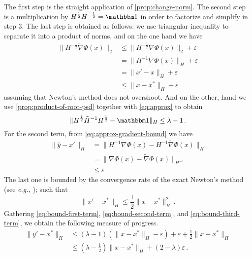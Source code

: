 The first step is the straight application of \autoref{prop:change-norm}. The
second step is a multiplication by $H^{\frac 1 2}H^{-\frac 1 2} = \mathbbm 1$ in
order to factorize and simplify in step 3. The last step is obtained as follows:
we use triangular inequality to separate it into a product of norms, and on the
one hand we have
\begin{equation*}
    \begin{aligned}
        \| H^{-\frac{1}{2}}\tilde \nabla \Phi(x)\|_2
        & \leq \| H^{-\frac{1}{2}} \nabla \Phi(x)\|_2 + \varepsilon\\
        & = \| H^{-1} \nabla \Phi(x)\|_H + \varepsilon \\
        & = \| x' - x \|_H + \varepsilon \\
        & \leq \| x - x^*\|_H + \varepsilon
   \end{aligned}
\end{equation*}
assuming that Newton's method does not overshoot. And on the other, hand we use
\autoref{prop:product-of-root-psd} together with \autoref{eq:approx} to obtain
\begin{equation*}
    \|H^{\frac{1}{2}}\tilde H^{-1}H^{\frac{1}{2}} - \mathbbm 1 \|_H \leq \lambda - 1 \, .
\end{equation*}
For the second term, from \autoref{eq:approx-gradient-bound} we have
\begin{equation}\label{eq:bound-second-term}
   \begin{aligned}
    \| \hat y - x' \|_H
        & = \|H^{-1}\nabla\Phi(x) - H^{-1}\tilde\nabla\Phi(x) \|_H \\
        & = \|\nabla\Phi(x) - \tilde\nabla\Phi(x) \|_{H^{-1}} \\
        & \leq \varepsilon
   \end{aligned}
\end{equation}
The last one is bounded by the convergence rate of the exact Newton's method
(see \emph{e.g.,} \cite[p. 43]{numerical_2006}); such that
\begin{equation}\label{eq:bound-third-term}
    \| x' - x^* \|_H \leq \frac{1}{2} \| x - x^*\|^2_H \, .
\end{equation}
Gathering \autoref{eq:bound-first-term}, \autoref{eq:bound-second-term}, and
\autoref{eq:bound-third-term}, we obtain the following measure of progress.
\begin{equation*}
    \begin{aligned}
        \| y' - x^* \|_H
            & \leq (\lambda - 1) \left(\|x - x^*\|_H - \varepsilon\right) + \varepsilon + \frac{1}{2} \| x - x^*\|_H \\
            & \leq (\lambda - \frac{1}{2})\|x - x^*\|_H + (2 - \lambda) \varepsilon \, .
    \end{aligned}
\end{equation*}

